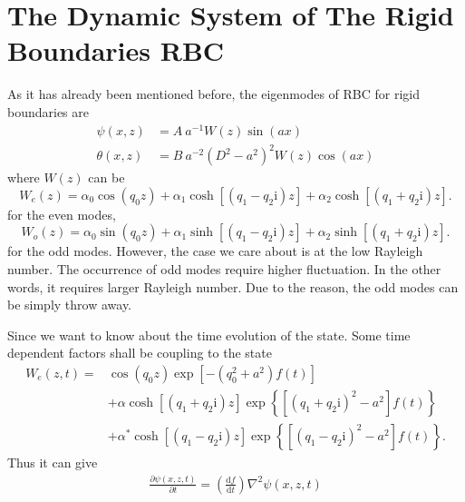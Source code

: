 \chapter{\label{chap:04}The Dynamic System of The Rigid Boundaries RBC}

As it has already been mentioned before, the eigenmodes of RBC for rigid boundaries are
\begin{align}
	\psi\left( x,z \right)&=A~a^{-1}W\left( z \right)\sin\left( ax \right) \label{equ:eigenmodes_velocity}\\
	\theta\left( x,z \right)&=B~a^{-2}\left( D^2-a^2 \right)^2W\left( z \right)\cos\left( ax \right) \label{equ:eigenmodes_temp}
\end{align}
where \(W\left( z \right)\) can be
\begin{equation*}
	W_e\left( z \right)=\alpha_0\cos\left( q_0 z \right)+\alpha_1\cosh\left[\left( q_1-q_2\mathrm{i}\right) z \right]+\alpha_2\cosh\left[ \left(q_1+q_2\mathrm{i}\right) z \right].
\end{equation*}
for the even modes,
\begin{equation*}
	W_o\left( z \right)=\alpha_0\sin\left( q_0 z \right)+\alpha_1\sinh\left[\left( q_1-q_2\mathrm{i}\right) z \right]+\alpha_2\sinh\left[ \left(q_1+q_2\mathrm{i}\right) z \right].
\end{equation*}
for the odd modes. However, the case we care about is at the low Rayleigh number. The occurrence of odd modes require higher fluctuation. In the other words, it requires larger Rayleigh number. Due to the reason, the odd modes can be simply throw away.\par
Since we want to know about the time evolution of the state. Some time dependent factors shall be coupling to the state
\begin{align*}
	W_e\left(z,t\right)=&\cos\left( q_0 z \right)\exp\left[-\left(q_0^2+a^2\right)f\left(t\right)\right]\\
	&+\alpha\cosh\left[\left( q_1+q_2\mathrm{i}\right) z \right]\exp\left\{\left[\left(q_1+q_2\mathrm{i}\right)^2-a^2\right]f\left(t\right)\right\}\\
	&+\alpha^*\cosh\left[ \left(q_1-q_2\mathrm{i}\right) z \right]\exp\left\{\left[\left(q_1-q_2\mathrm{i}\right)^2-a^2\right]f\left(t\right)\right\}.
\end{align*}
Thus it can give
\begin{align*}
	\frac{\partial \psi\left(x,z,t\right)}{\partial t}=\left(\frac{\mathrm{d} f}{\mathrm{d} t}\right)\nabla^2\psi\left(x,z,t\right)
\end{align*}
